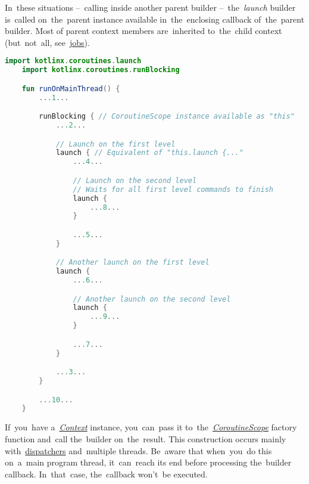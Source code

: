 In~these situations --~calling inside another parent builder \mbox{-- the \textit{launch}} builder is~called on~the~parent  instance available in~the~enclosing callback of~the~parent builder.
Most of parent context members are~inherited to~the~child context (but~not~all, see~\hyperref[kotlincoroutinejob]{jobs}).

\begin{lstlisting}[language=Kotlin, title={Numbers represent the~order of~execution}]
    import kotlinx.coroutines.launch
    import kotlinx.coroutines.runBlocking

    fun runOnMainThread() {
        ...1...

        runBlocking { // CoroutineScope instance available as "this"
            ...2...

            // Launch on the first level
            launch { // Equivalent of "this.launch {..."
                ...4...

                // Launch on the second level
                // Waits for all first level commands to finish
                launch {
                    ...8...
                }

                ...5...
            }

            // Another launch on the first level
            launch {
                ...6...

                // Another launch on the second level
                launch {
                    ...9...
                }

                ...7...
            }

            ...3...
        }

        ...10...
    }
\end{lstlisting}
\newline

\noindent If~you~have \mbox{a \hyperref[kotlincoroutinecontext]{\textit{Context}}} instance, you~can~pass it \mbox{to the \hyperref[kotlincoroutinescope]{\textit{CoroutineScope}}} factory function and~call the~builder on~the~result.
This construction occurs mainly with~\hyperref[kotlincoroutinedispatcher]{dispatchers} and~multiple threads.
Be~aware that when~you~do this on~a~main program thread, it~can~reach its end before processing the~builder callback.
In~that~case, the~callback won't~be executed.

